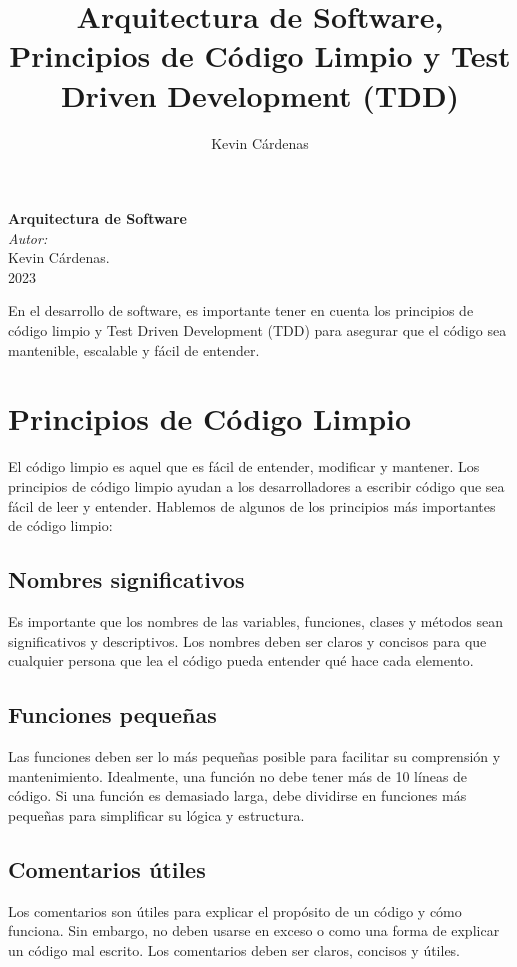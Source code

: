 \documentclass[executivepaper]{article}
\title{Arquitectura de Software, Principios de Código Limpio y Test Driven Development (TDD)}
\author{Kevin Cárdenas}
\begin{document}
\begin{titlepage}
    \begin{center}
        {\Huge \textbf{Arquitectura de Software}}
        \\[18cm]

        \large\emph{Autor:}\\
        Kevin Cárdenas.
        \\[1cm]
        {\large 2023}
    \end{center}
\end{titlepage}

\newpage
\tableofcontents
\newpage

En el desarrollo de software, es importante tener en cuenta los principios de código limpio y Test Driven Development (TDD) para asegurar que el código sea mantenible, escalable y fácil de entender.

\section{Principios de Código Limpio}
El código limpio es aquel que es fácil de entender, modificar y mantener. Los principios de código limpio ayudan a los desarrolladores a escribir código que sea fácil de leer y entender. Hablemos de algunos de los principios más importantes de código limpio:

\subsection*{Nombres significativos}
Es importante que los nombres de las variables, funciones, clases y métodos sean significativos y descriptivos. Los nombres deben ser claros y concisos para que cualquier persona que lea el código pueda entender qué hace cada elemento.

\subsection*{Funciones pequeñas}
Las funciones deben ser lo más pequeñas posible para facilitar su comprensión y mantenimiento. Idealmente, una función no debe tener más de 10 líneas de código. Si una función es demasiado larga, debe dividirse en funciones más pequeñas para simplificar su lógica y estructura.

\subsection*{Comentarios útiles}
Los comentarios son útiles para explicar el propósito de un código y cómo funciona. Sin embargo, no deben usarse en exceso o como una forma de explicar un código mal escrito. Los comentarios deben ser claros, concisos y útiles.
\end{document}
